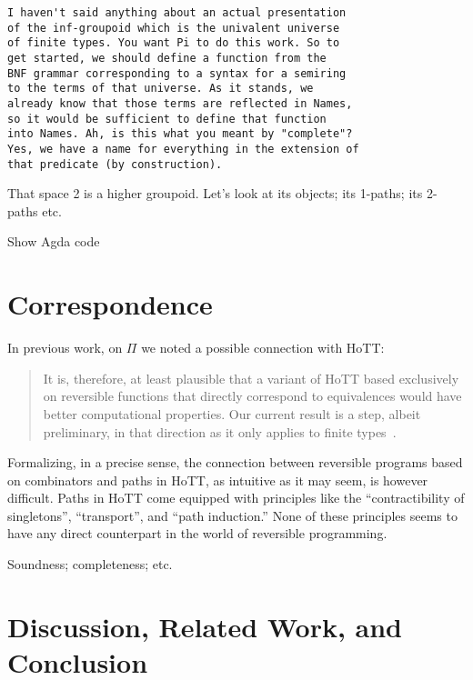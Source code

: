 \documentclass{entcs}
\begin{document}
\begin{verbatim}
I haven't said anything about an actual presentation
of the inf-groupoid which is the univalent universe
of finite types. You want Pi to do this work. So to
get started, we should define a function from the
BNF grammar corresponding to a syntax for a semiring
to the terms of that universe. As it stands, we
already know that those terms are reflected in Names,
so it would be sufficient to define that function
into Names. Ah, is this what you meant by "complete"?
Yes, we have a name for everything in the extension of
that predicate (by construction).

\end{verbatim}


That space {2} is a higher groupoid. Let's look at its objects; its 1-paths; its
2-paths etc.

Show Agda code

\section{Correspondence}
\label{sec:connection}

In previous work, on $\Pi$ we noted a possible connection with HoTT:
\begin{quote}
  It is, therefore, at least plausible that a variant of HoTT based exclusively
  on reversible functions that directly correspond to equivalences would have
  better computational properties. Our current result is a step, albeit
  preliminary, in that direction as it only applies to finite
  types~\cite{Carette2016}.
\end{quote}
Formalizing, in a precise sense, the connection between reversible programs
based on combinators and paths in HoTT, as intuitive as it may seem, is however
difficult. Paths in HoTT come equipped with principles like the
``contractibility of singletons'', ``transport'', and ``path induction.'' None
of these principles seems to have any direct counterpart in the world of
reversible programming.

Soundness; completeness; etc.


\section{Discussion, Related Work, and Conclusion}
\label{sec:conclusion}
\end{document}
